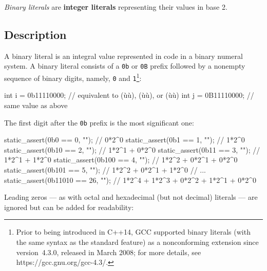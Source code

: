 \textit{Binary literals} are \textbf{integer literals} representing their values in base 2.

\subsection[Description]{Description}\label{description-binary}

A binary literal is an integral value represented in code in a binary numeral system. A binary literal consists of a \lstinline!0b! or \lstinline!0B! prefix followed by a nonempty sequence of binary digits, namely, \lstinline!0! and \lstinline!1!{\cprotect\footnote{Prior to being introduced in C++14, GCC supported binary literals (with the same syntax as the standard feature) as a nonconforming extension since version~4.3.0, released in March 2008;
for more details, see https://gcc.gnu.org/gcc-4.3/.}}:


\begin{emcppslisting}[emcppsbatch=e1]
int i = 0b11110000;  // equivalent to (ù{}ù), (ù{}ù), or (ù{}ù)
int j = 0B11110000;  // same value as above
\end{emcppslisting}

\noindent The first digit after the \lstinline!0b! prefix is the most significant
one:

\begin{emcppslisting}[emcppsbatch=e1]
static_assert(0b0     ==  0, "");  // 0*2^0
static_assert(0b1     ==  1, "");  // 1*2^0
static_assert(0b10    ==  2, "");  // 1*2^1 + 0*2^0
static_assert(0b11    ==  3, "");  // 1*2^1 + 1*2^0
static_assert(0b100   ==  4, "");  // 1*2^2 + 0*2^1 + 0*2^0
static_assert(0b101   ==  5, "");  // 1*2^2 + 0*2^1 + 1*2^0
// ...
static_assert(0b11010 == 26, "");  // 1*2^4 + 1*2^3 + 0*2^2 + 1*2^1 + 0*2^0
\end{emcppslisting}


\noindent Leading zeros --- as with octal and hexadecimal (but not decimal)
literals --- are ignored but can be added for readability:


